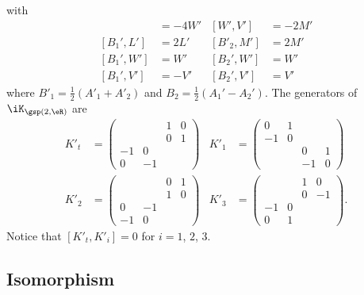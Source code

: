 with
\begin{align*}
	[L',V']   & =-4W' & [W',V']   & =-2M' \\
	[B_1',L'] & =2L'  & [B'_2,M'] & =2M'  \\
	[B_1',W'] & =W'   & [B_2',W'] & =W'   \\
	[B_1',V'] & =-V'  & [B_2',V'] & =V'
\end{align*}
where $B'_1=\frac{ 1 }{2}(A'_1+A'_2)$ and $B_2=\frac{ 1 }{2}(A_1'-A_2')$. The generators of $\iK_{\gsp(2,\eR)}$ are
\begin{align*}
	K'_t & =
	\begin{pmatrix}
		   &    & 1 & 0 \\
		   &    & 0 & 1 \\
		-1 & 0          \\
		0  & -1
	\end{pmatrix}
	     & K'_1 & =
	\begin{pmatrix}
		0 & 1          \\-1&0\\
		  &   & 0  & 1 \\
		  &   & -1 & 0
	\end{pmatrix} \\
	K'_2 & =
	\begin{pmatrix}
		 &  & 0 & 1 \\&&1&0\\0&-1\\-1&0
	\end{pmatrix}
	     & K'_3 & =
	\begin{pmatrix}
		   &   & 1 & 0  \\
		   &   & 0 & -1 \\
		-1 & 0          \\
		0  & 1
	\end{pmatrix}.
\end{align*}
Notice that $[K'_t,K'_i]=0$ for $i=1$, $2$, $3$.


\subsection{Isomorphism}		\label{SubSecIsosp}

